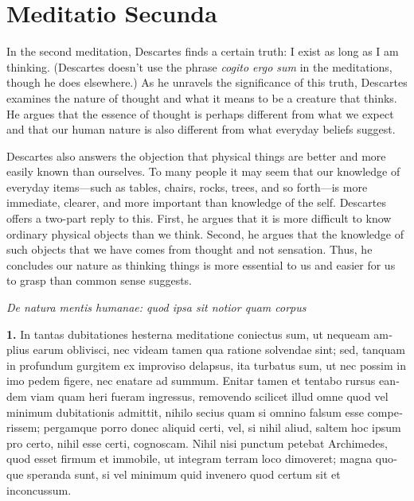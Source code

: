 \chapter{Meditatio Secunda}


In the second meditation, Descartes finds a certain truth: I exist as long as I am thinking. (Descartes doesn't use the phrase \textit{cogito ergo sum} in the meditations, though he does elsewhere.) As he unravels the significance of this truth, Descartes examines the nature of thought and what it means to be a creature that thinks. He argues that the essence of thought is perhaps different from what we expect and that our human nature is also different from what everyday beliefs suggest.

Descartes also answers the objection that physical things are better and more easily known than ourselves. To many people it may seem that our knowledge of everyday items---such as tables, chairs, rocks, trees, and so forth---is more immediate, clearer, and more important than knowledge of the self. Descartes offers a two-part reply to this. First, he argues that it is more difficult to know ordinary physical objects than we think. Second, he argues that the knowledge of such objects that we have comes from thought and not sensation. Thus, he concludes our nature as thinking things is more essential to us and easier for us to grasp than common sense suggests.

\clearpage

\clearpage
\begin{center}
    \beginnumbering
    \numberlinefalse
    \pstart
    \textit{De natura mentis humanae: quod ipsa sit notior quam corpus}
    \pend
    \endnumbering
\end{center}

\beginnumbering
\pstart
\begin{latin}
    \textenglish{\textbf{1.}} In tantas dubitationes hesterna meditatione coniectus sum, ut nequeam amplius earum oblivisci, nec videam tamen qua ratione solvendae sint; sed, tanquam in profundum gurgitem ex improviso delapsus, ita turbatus sum, ut nec possim in imo pedem figere, nec enatare ad summum. Enitar tamen et tentabo rursus eandem viam quam heri fueram ingressus, removendo scilicet illud omne quod vel minimum dubitationis admittit, nihilo secius quam si omnino falsum esse comperissem; pergamque porro donec aliquid certi, vel, si nihil aliud, saltem hoc ipsum pro certo, nihil esse certi, cognoscam. Nihil nisi punctum petebat Archimedes, quod esset firmum et immobile, ut integram terram loco dimoveret; magna quoque speranda sunt, si vel minimum quid invenero quod certum sit et inconcussum.
\end{latin}
\pend
\endnumbering

